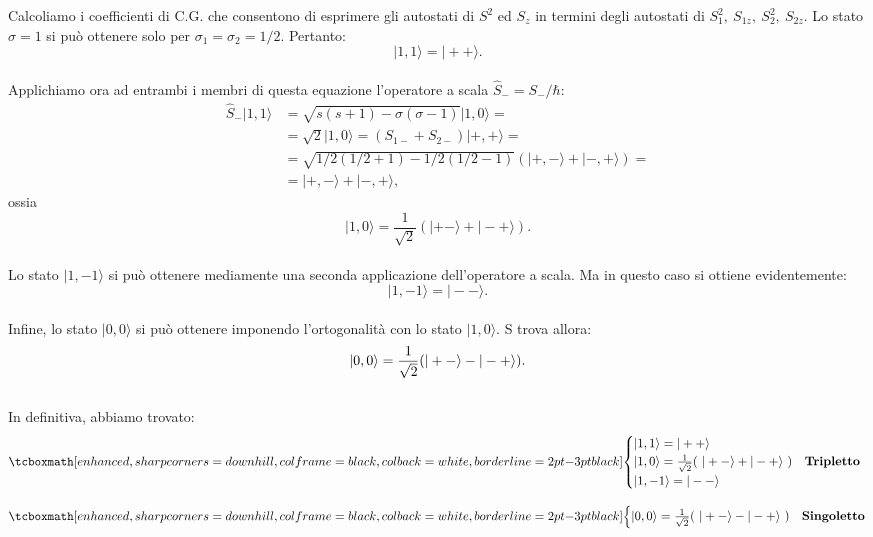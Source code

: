 Calcoliamo i coefficienti di C.G. che consentono di esprimere gli autostati di $S^2$ ed $S_z$ in termini degli autostati di $S_1^2 ,~ S_{1z}, ~ S_2^2, ~ S_{2z}$. Lo stato $\sigma=1$ si può ottenere solo per $\sigma_1=\sigma_2=1/2$. Pertanto:
	\begin{equation}
		|1,1\rangle = |++\rangle  .
	\end{equation}\\

Applichiamo ora ad entrambi i membri di questa equazione l'operatore a scala $\hat{S}_-=S_- /\hbar$:
	\begin{align}
		 \hat{S}_- |1,1\rangle & = \sqrt{s(s+1) - \sigma(\sigma -1)}  |1,0\rangle =\nonumber \\
		&=\sqrt{2} |1,0\rangle=  (S_{1-}+S_{2-})  |+,+\rangle =  \nonumber \\
		&= \sqrt{1/2 (1/2+1) -1/2 (1/2-1)} \left( |+,-\rangle + |-,+\rangle \right)= \nonumber \\
		&= |+,-\rangle   +   |-,+\rangle ,
	\end{align}
ossia
	\begin{equation}
		|1,0\rangle = \frac{1}{\sqrt{2}} (|+-\rangle + |-+\rangle) .
	\end{equation}\\
	
Lo stato $|1,-1\rangle$ si può ottenere mediamente una seconda applicazione dell'operatore a scala. Ma in questo caso si ottiene evidentemente:
	\begin{equation}
		|1,-1\rangle = |--\rangle .
	\end{equation}\\
	
Infine, lo stato $|0,0\rangle$ si può ottenere imponendo l'ortogonalità con lo stato $|1,0\rangle$. S trova allora:
	\begin{equation}
		|0,0\rangle = \frac{1}{\sqrt{2}} (|+-\rangle - |-+\rangle). \\
	\end{equation}\\
	
In definitiva, abbiamo trovato:
	\begin{align}
		&\tcboxmath[enhanced, sharp corners=downhill, colframe=black, colback=white, borderline={2pt}{-3pt}{black}]{
		\begin{cases} 
			|1,1\rangle = |++\rangle  \\
			|1,0\rangle = \frac{1}{\sqrt{2}} (~|+-\rangle + |-+\rangle ~)    & \mbox{\textrm{\textbf{Tripletto~}}} \\
			|1,-1\rangle = |--\rangle   \\
\end{cases}
		}\\[0.3cm]
		&\tcboxmath[enhanced, sharp corners=downhill, colframe=black, colback=white, borderline={2pt}{-3pt}{black}]{
		\begin{cases} 
			|0,0\rangle = \frac{1}{\sqrt{2}} (~|+-\rangle - |-+\rangle~)    & \mbox{\textrm{\textbf{Singoletto}}}\\
		\end{cases}
		}
	\end{align}

